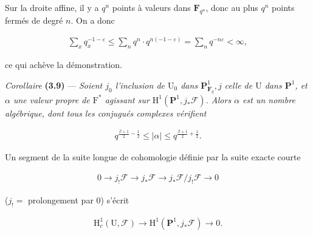 \documentclass[10pt,leqno]{article}
\begin{document}
\noindent Sur la droite affine, il y a \(q^{n}\) points à valeurs dans \(\mathbf{F}_{q^{n}}\), donc au plus \(q^{n}\) points fermés de degré \(n\). On a donc\par

\begin{equation*}\begin{gathered}\sum _{x} q_{x}^{- 1- \varepsilon } \leq  \sum _{n} q^{n}\cdot q^{n(- 1- \varepsilon )} = \sum _{n} q^{- n\varepsilon } < \infty ,\end{gathered}\end{equation*}

\noindent ce qui achève la démonstration.\par

\noindent \emph{Corollaire} \textbf{(3.9)} — {\itshape Soient \(j_{0}\) l’inclusion de \(\mathrm{U}_{0}\) dans \(\mathbf{P}^{1}_{\mathbf{F}_{q}}, j\) celle de \(\mathrm{U}\) dans \(\mathbf{P}^{1}\), et \(\alpha \) une valeur propre de \(\mathrm{F}^{*}\) agissant sur \(\mathrm{H}^{1}(\mathbf{P}^{1},j_{*}\mathcal{F} )\). Alors \(\alpha \) est un nombre algébrique, dont tous les conjugués complexes vérifient}\par

\begin{equation*}\begin{gathered}q^{\frac{\beta+1}{2}- \frac{1}{2}} \leq  |\alpha | \leq  q^{\frac{\beta+1}{2}+\frac{1}{2}}.\end{gathered}\end{equation*}

\noindent Un segment de la suite longue de cohomologie définie par la suite exacte courte\par

\begin{equation*}\begin{gathered}0 \longrightarrow  j_{!}\mathcal{F}  \longrightarrow  j_{*}\mathcal{F}  \longrightarrow  j_{*}\mathcal{F} /j_{!}\mathcal{F}  \longrightarrow  0\end{gathered}\end{equation*}

\noindent (\(j_{!} =\) prolongement par 0) s’écrit\par

\begin{equation*}\begin{gathered}\mathrm{H}_{c}^{1}(\mathrm{U},\mathcal{F} ) \longrightarrow  \mathrm{H}^{1}(\mathbf{P}^{1},j_{*}\mathcal{F} ) \longrightarrow  0.\end{gathered}\end{equation*}
\end{document}
